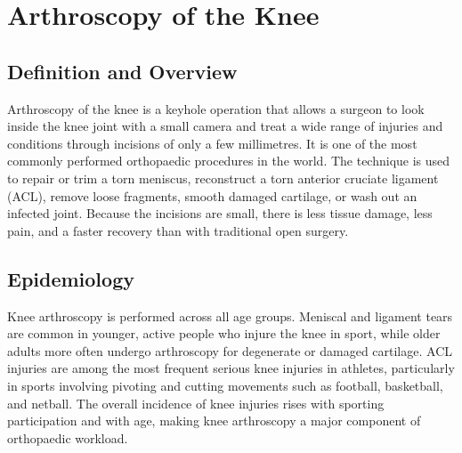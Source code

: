\chapter{Arthroscopy of the Knee}

\section*{Definition and Overview}
Arthroscopy of the knee is a keyhole operation that allows a surgeon to look inside the knee joint with a small camera and treat a wide range of injuries and conditions through incisions of only a few millimetres. It is one of the most commonly performed orthopaedic procedures in the world. The technique is used to repair or trim a torn meniscus, reconstruct a torn anterior cruciate ligament (ACL), remove loose fragments, smooth damaged cartilage, or wash out an infected joint. Because the incisions are small, there is less tissue damage, less pain, and a faster recovery than with traditional open surgery.

\section*{Epidemiology}
Knee arthroscopy is performed across all age groups. Meniscal and ligament tears are common in younger, active people who injure the knee in sport, while older adults more often undergo arthroscopy for degenerate or damaged cartilage. ACL injuries are among the most frequent serious knee injuries in athletes, particularly in sports involving pivoting and cutting movements such as football, basketball, and netball. The overall incidence of knee injuries rises with sporting participation and with age, making knee arthroscopy a major component of orthopaedic workload.

